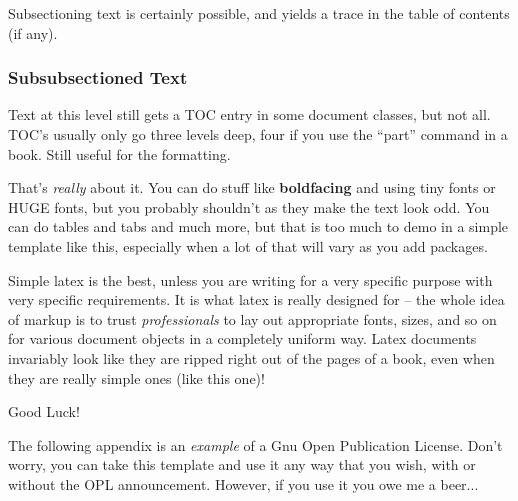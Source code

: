 \documentclass{article}
\begin{document}
Subsectioning text is certainly possible, and yields a trace in the
table of contents (if any).

\subsubsection{Subsubsectioned Text}

Text at this level still gets a TOC entry in some document classes, but
not all.  TOC's usually only go three levels deep, four if you use
the ``part'' command in a book.  Still useful for the formatting.

That's {\em really} about it.  You can do stuff like {\bf boldfacing}
and using {\tiny tiny} fonts or {\huge HUGE} fonts, but you probably
shouldn't as they make the text look odd.  You can do tables and tabs
and much more, but that is too much to demo in a simple template like
this, especially when a lot of that will vary as you add packages.

Simple latex is the best, unless you are writing for a very specific
purpose with very specific requirements.  It is what latex is really
designed for -- the whole idea of markup is to trust {\em professionals}
to lay out appropriate fonts, sizes, and so on for various document
objects in a completely uniform way.  Latex documents invariably look
like they are ripped right out of the pages of a book, even when they
are really simple ones (like this one)!

Good Luck!

The following appendix is an {\em example} of a Gnu Open Publication
License.  Don't worry, you can take this template and use it any way
that you wish, with or without the OPL announcement.  However, if you
use it you owe me a beer...


\end{document}
